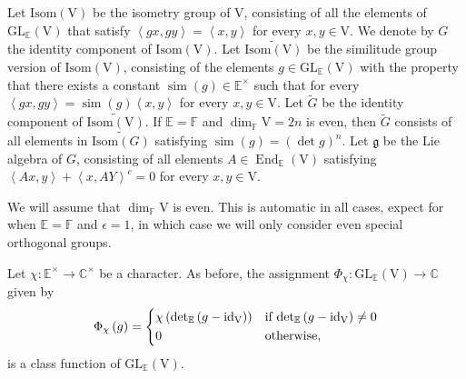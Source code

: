 \documentclass[12pt, reqno]{amsart}
\theoremstyle{definition}
\theoremstyle{definition}
\theoremstyle{definition}
\newcommand{\cComplex}{\mathbb{C}}
\newcommand{\multiplicativegroup}[1]{#1^{\times}}
\newcommand{\detQuadratic}{{\det}_{\quadraticExtension}}
\newcommand{\EndomorphismRing}{\operatorname{End}}
\newcommand{\idmap}{\mathrm{id}}
\newcommand{\hermitianSpace}{\mathrm{V}}
\newcommand{\similitudeCharacter}{\operatorname{sim}}
\newcommand{\innerproduct}[2]{\left\langle #1,#2\right\rangle}
\newcommand{\involution}[1]{#1^{c}}
\newcommand{\GL}{\mathrm{GL}}
\newcommand{\GroupExtension}[1]{\widetilde{#1}}
\newcommand{\finiteField}{\mathbb{F}}
\newcommand{\quadraticExtension}{\mathbb{E}}
\newcommand{\IsometryGroup}{\mathrm{Isom}}
\newcommand{\lieAlgebra}{\mathfrak{g}}
\begin{document}
Let $\IsometryGroup \left(\hermitianSpace\right)$ be the isometry group of $\hermitianSpace$, consisting of all the elements of $\GL_{\quadraticExtension}\left(\hermitianSpace\right)$ that satisfy $\innerproduct{gx}{gy} = \innerproduct{x}{y}$ for every $x,y \in \hermitianSpace$. We denote by $G$ the identity component of $\IsometryGroup\left(\hermitianSpace\right)$. Let $\GroupExtension{\IsometryGroup\left(\hermitianSpace\right)}$ be the similitude group version of $\IsometryGroup\left(\hermitianSpace\right)$, consisting of the elements $g \in \GL_{\quadraticExtension}\left(\hermitianSpace\right)$ with the property that there exists a constant $\similitudeCharacter\left(g\right) \in \multiplicativegroup{\quadraticExtension}$ such that for every $\innerproduct{gx}{gy} = \similitudeCharacter\left(g\right) \innerproduct{x}{y}$ for every $x,y \in \hermitianSpace$. Let $\GroupExtension{G}$ be the identity component of $\GroupExtension{\IsometryGroup\left(\hermitianSpace\right)}$. If $\quadraticExtension = \finiteField$ and $\dim_{\finiteField} \hermitianSpace = 2n$ is even, then $\GroupExtension{G}$ consists of all elements in $\GroupExtension{\IsometryGroup\left(G\right)}$ satisfying $\similitudeCharacter\left(g\right) = \left(\det g\right)^n$. Let $\lieAlgebra$ be the Lie algebra of $G$, consisting of all elements $A \in \EndomorphismRing_{\quadraticExtension}\left(\hermitianSpace\right)$ satisfying $\innerproduct{Ax}{y} + \involution{\innerproduct{x}{AY}} = 0$ for every $x, y \in \hermitianSpace$.

We will assume that $\dim_{\finiteField} \hermitianSpace$ is even. This is automatic in all cases, expect for when $\quadraticExtension = \finiteField$ and $\epsilon = 1$, in which case we will only consider even special orthogonal groups.

Let $\chi \colon \multiplicativegroup{\quadraticExtension} \to \multiplicativegroup{\cComplex}$ be a character. As before, the assignment $\Phi_{\chi} \colon \GL_{\quadraticExtension}\left(\hermitianSpace\right) \to \cComplex$ given by $$\Phi_{\chi}\left(g\right) = \begin{dcases}
\chi\left(\detQuadratic\left(g - \idmap_{\hermitianSpace}\right)\right) & \text{if }\detQuadratic\left(g - \idmap_{\hermitianSpace}\right) \ne 0\\
0 & \text{otherwise,}
\end{dcases}$$
is a class function of $\GL_{\quadraticExtension}\left(\hermitianSpace\right)$.
\end{document}
